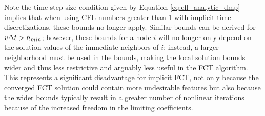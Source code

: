 Note the time step size condition given by Equation \eqref{eq:cfl_analytic_dmp}
implies that when using CFL numbers greater than 1 with implicit time
discretizations, these bounds no longer apply. Similar bounds can be derived
for $v\Delta t > h_{min}$; however, these bounds for a node $i$ will no longer
only depend on the solution values of the immediate neighbors of $i$; instead, a larger neighborhood
must be used in the bounds, making the local solution bounds wider and thus less
restrictive and arguably less useful in the FCT algorithm. This represents a
significant disadvantage for implicit FCT, not only because the converged
FCT solution could contain more undesirable features but also because the wider
bounds typically result in a greater number of nonlinear iterations because
of the increased freedom in the limiting coefficients.

